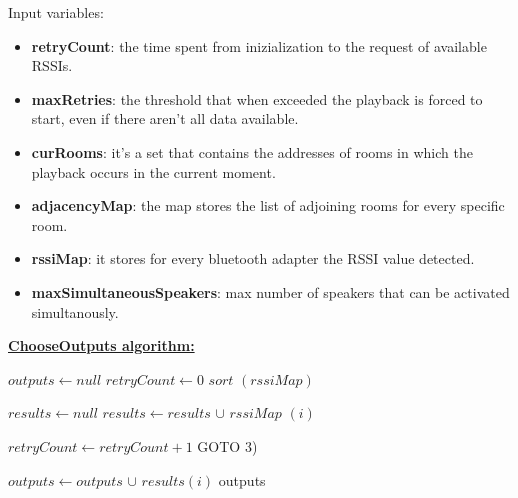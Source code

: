 \documentclass[conference]{./IEEEtran}
\begin{document}
Input variables:
\begin{itemize}
\item \textbf{retryCount}: the time spent from inizialization to the request of available RSSIs.
\item \textbf{maxRetries}: the threshold that when exceeded the playback is forced to start, even if there aren't all data available.
\item \textbf{curRooms}: it's a set that contains the addresses of rooms in which the playback occurs in the current moment.
\item \textbf{adjacencyMap}: the map stores the list of adjoining rooms for every specific room.   
\item \textbf{rssiMap}: it stores for every bluetooth adapter the RSSI value detected.
\item \textbf{maxSimultaneousSpeakers}: max number of speakers that can be activated simultanously.
\end{itemize}
\textbf{\underline{ChooseOutputs algorithm:}}
\vspace{0.3cm}
\begin{algorithmic}[1]

\STATE $outputs \gets null$ 
\STATE $retryCount \gets 0$
\STATE $sort$ $(rssiMap)$  

\STATE $results \gets null$
\STATE $results \gets results$ $\cup$ $rssiMap$ $(i)$ 
\ENDFOR

\STATE $ retryCount \gets retryCount + 1 $ 
\STATE GOTO 3)
\ENDIF

		\STATE $outputs \gets outputs$ $\cup$ $results(i)$ 
	\ENDIF
\ENDFOR
\RETURN outputs
\end{algorithmic}
\end{document}
